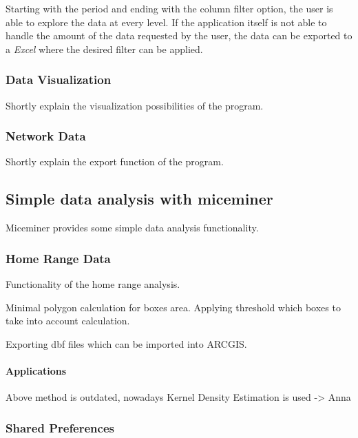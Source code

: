 Starting with the period and ending with the column filter option, the user is able to explore the data at every level. If the application itself is not able to handle the amount of the data requested by the user, the data can be exported to a \textit{Excel} where the desired filter can be applied.       

\subsubsection{Data Visualization}
\label{subsubsec:datavis}

Shortly explain the visualization possibilities of the program.

\subsubsection{Network Data}
\label{subsubsec:dataexp}

Shortly explain the export function of the program.

\subsection{Simple data analysis with miceminer}
\label{subsec:dataana} 

Miceminer provides some simple data analysis functionality.

\subsubsection{Home Range Data}
\label{subsubsec:homerangedata} 

Functionality of the home range analysis.

Minimal polygon calculation for boxes area.
Applying threshold which boxes to take into account calculation. 

Exporting dbf files which can be imported into ARCGIS.

\paragraph{Applications}
Above method is outdated, nowadays Kernel Density Estimation is used -> Anna

\subsubsection{Shared Preferences}
\label{subsubsec:sharedpref} 

